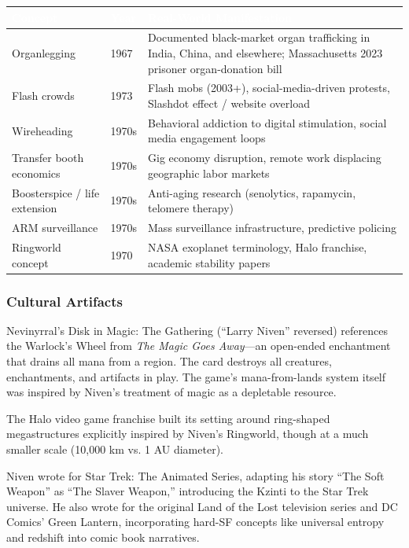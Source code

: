 \documentclass[11pt,letterpaper]{article}
\newcommand{\tableheader}[1]{\textbf{\sffamily\textcolor{white}{#1}}}
\begin{document}
\begin{center}
\begin{tabularx}{\textwidth}{L{2.5cm}C{1.2cm}X}
\toprule
{}
\tableheader{Concept} & \tableheader{Year} & \tableheader{Real-World Manifestation} \\
\midrule
Organlegging & 1967 & Documented black-market organ trafficking in India, China, and elsewhere; Massachusetts 2023 prisoner organ-donation bill \\
Flash crowds & 1973 & Flash mobs (2003+), social-media-driven protests, Slashdot effect / website overload \\
Wireheading & 1970s & Behavioral addiction to digital stimulation, social media engagement loops \\
Transfer booth economics & 1970s & Gig economy disruption, remote work displacing geographic labor markets \\
Boosterspice / life extension & 1970s & Anti-aging research (senolytics, rapamycin, telomere therapy) \\
ARM surveillance & 1970s & Mass surveillance infrastructure, predictive policing \\
Ringworld concept & 1970 & NASA exoplanet terminology, Halo franchise, academic stability papers \\
\bottomrule
\end{tabularx}
\end{center}

\subsubsection{Cultural Artifacts}

Nevinyrral's Disk in Magic: The Gathering (``Larry Niven'' reversed) references the Warlock's Wheel from \textit{The Magic Goes Away}---an open-ended enchantment that drains all mana from a region. The card destroys all creatures, enchantments, and artifacts in play. The game's mana-from-lands system itself was inspired by Niven's treatment of magic as a depletable resource.

The Halo video game franchise built its setting around ring-shaped megastructures explicitly inspired by Niven's Ringworld, though at a much smaller scale (10,000 km vs. 1 AU diameter).

Niven wrote for Star Trek: The Animated Series, adapting his story ``The Soft Weapon'' as ``The Slaver Weapon,'' introducing the Kzinti to the Star Trek universe. He also wrote for the original Land of the Lost television series and DC Comics' Green Lantern, incorporating hard-SF concepts like universal entropy and redshift into comic book narratives.
\end{document}
